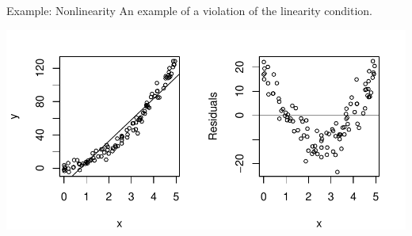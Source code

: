 \documentclass[10pt]{beamer}
\begin{document}
\begin{frame}{Example: Nonlinearity}
An example of a violation of the linearity condition.

\centering
\includegraphics[scale=0.6]{figure/resid_nonlin.pdf}
\end{frame}
\end{document}

